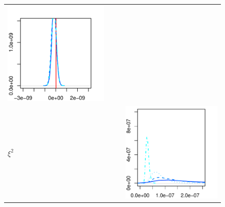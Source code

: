 \documentclass[10pt]{article}
\begin{document}
\begin{figure}[h!]
\begin{tabular}{m{0.25cm}ccc}
\begin{minipage}{0.20\textwidth}
				\includegraphics[width=1\linewidth]{results-real-data-plots-MUS-microstructure-MU-XI-Inf-SDs-0.pdf}
				\end{minipage} \\
%
          \begin{sideways} $\xi^2$ \end{sideways}
			&
			&
			&\begin{minipage}{0.20\textwidth}
				\centering
				\includegraphics[width=1\linewidth]{results-real-data-plots-microstructure-XI.pdf}

\end{minipage}
\end{tabular}
\end{figure}
\end{document}
